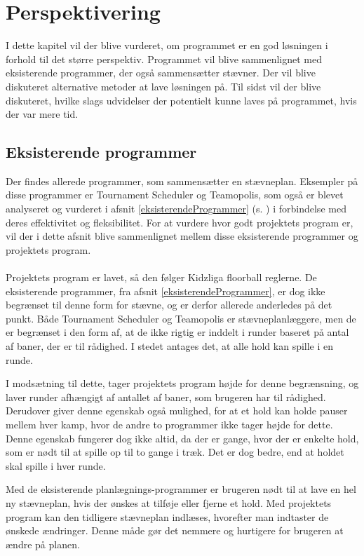 \chapter{Perspektivering}\label{ch:chlabel}
I dette kapitel vil der blive vurderet, om programmet er en god løsningen i forhold til det større perspektiv. Programmet vil blive sammenlignet med eksisterende programmer, der også sammensætter stævner. Der vil blive diskuteret alternative metoder at lave løsningen på. Til sidst vil der blive diskuteret, hvilke slags udvidelser der potentielt kunne laves på programmet, hvis der var mere tid. 

\section*{Eksisterende programmer}
Der findes allerede programmer, som sammensætter en stævneplan. Eksempler på disse programmer er Tournament Scheduler og Teamopolis, som også er blevet analyseret og vurderet i afsnit \ref{eksisterendeProgrammer} (s. \pageref{eksisterendeProgrammer}) i forbindelse med deres effektivitet og fleksibilitet. For at vurdere hvor godt projektets program er, vil der i dette afsnit blive sammenlignet mellem disse eksisterende programmer og projektets program.
\\\\
Projektets program er lavet, så den følger Kidzliga floorball reglerne. De eksisterende programmer, fra afsnit \ref{eksisterendeProgrammer}, er dog ikke begrænset til denne form for stævne, og er derfor allerede anderledes på det punkt. Både Tournament Scheduler og Teamopolis er stævneplanlæggere, men de er begrænset i den form af, at de ikke rigtig er inddelt i runder baseret på antal af baner, der er til rådighed. I stedet antages det, at alle hold kan spille i en runde. 
\par
I modsætning til dette, tager projektets program højde for denne begrænsning, og laver runder afhængigt af antallet af baner, som brugeren har til rådighed. Derudover giver denne egenskab også mulighed, for at et hold kan holde pauser mellem hver kamp, hvor de andre to programmer ikke tager højde for dette. Denne egenskab fungerer dog ikke altid, da der er gange, hvor der er enkelte hold, som er nødt til at spille op til to gange i træk. Det er dog bedre, end at holdet skal spille i hver runde. 
\par
Med de eksisterende planlægnings-programmer er brugeren nødt til at lave en hel ny stævneplan, hvis der ønskes at tilføje eller fjerne et hold. Med projektets program kan den tidligere stævneplan indlæses, hvorefter man indtaster de ønskede ændringer. Denne måde gør det nemmere og hurtigere for brugeren at ændre på planen.
